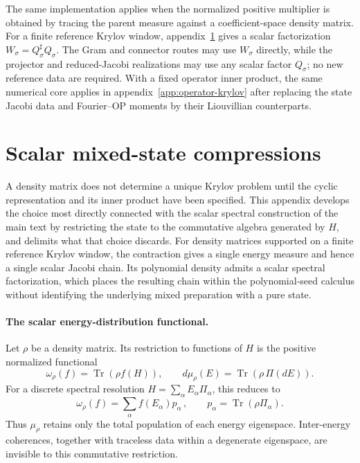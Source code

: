 \documentclass[a4paper,11pt]{article}
\def\dd{d}%
\theoremstyle{definition}
\theoremstyle{remark}
\newcommand{\dd}{\mathrm d}
\begin{document}
The same implementation applies when the normalized positive
multiplier is obtained by tracing the parent measure against a
coefficient-space density matrix. For a finite reference Krylov window,
appendix~\ref{app:mixed-seeds} gives a scalar factorization
$W_\sigma=Q_\sigma^\sharp Q_\sigma$.  The Gram and connector routes may
use $W_\sigma$ directly, while the projector and reduced-Jacobi
realizations may use any scalar factor $Q_\sigma$; no new reference data
are required.  With a fixed operator inner product, the same numerical
core applies in appendix~\ref{app:operator-krylov} after replacing the
state Jacobi data and Fourier--OP moments by their Liouvillian
counterparts.

\section{Scalar mixed-state compressions}
\label{app:mixed-seeds}

A density matrix does not determine a unique Krylov problem until the
cyclic representation and its inner product have been specified. This appendix develops the choice most directly connected with the scalar spectral construction of the main text by restricting the state to the commutative algebra generated by $H$, and delimits what that choice discards.  For density matrices supported on a finite reference Krylov window,
the contraction gives a single energy measure and hence a single scalar
Jacobi chain. Its polynomial density admits a scalar spectral
factorization, which places the resulting chain within the
polynomial-seed calculus without identifying the underlying mixed
preparation with a pure state.

\paragraph{The scalar energy-distribution functional.}
Let $\rho$ be a density matrix.  Its restriction to functions of $H$ is
the positive normalized functional
\begin{equation}
   \omega_\rho(f)=\operatorname{Tr}\!\left(\rho f(H)\right),
   \qquad
   \dd\mu_\rho(E)=\operatorname{Tr}\!\left(\rho\,\Pi(\dd E)\right).
   \label{eq:mixed-functional-app}
\end{equation}
For a discrete spectral resolution
$H=\sum_{\alpha}E_\alpha\Pi_\alpha$, this reduces to
\begin{equation}
   \omega_\rho(f)
   =\sum_{\alpha}f(E_\alpha)p_\alpha\,,
   \qquad
   p_\alpha=\operatorname{Tr}(\rho\Pi_\alpha).
\end{equation}
Thus $\mu_\rho$ retains only the total population of each energy
eigenspace.  Inter-energy coherences, together with traceless data within
a degenerate eigenspace, are invisible to this commutative restriction.
\end{document}
